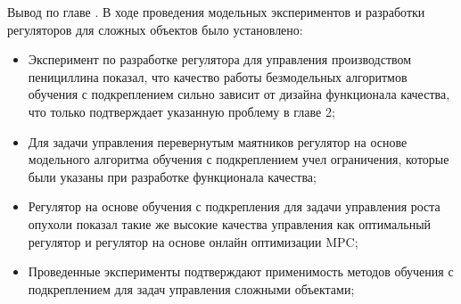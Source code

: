 Вывод по главе \thechapter. В ходе проведения модельных экспериментов и разработки регуляторов для сложных объектов было установлено:
\begin{itemize}
	
	\item Эксперимент по разработке регулятора для управления производством пенициллина показал, что качество работы безмодельных алгоритмов обучения с подкреплением сильно зависит от дизайна  функционала качества, что только подтверждает указанную проблему в главе 2;
	\item Для задачи управления перевернутым маятников регулятор на основе модельного алгоритма обучения с подкреплением учел ограничения, которые были указаны при разработке функционала качества; 
	\item Регулятор на основе обучения с подкрепления для задачи управления роста опухоли показал такие же высокие качества управления как оптимальный регулятор и регулятор на основе онлайн оптимизации MPC;
	\item Проведенные эксперименты подтверждают применимость методов обучения с подкреплением для задач управления сложными объектами;
\end{itemize}

\newpage
%
